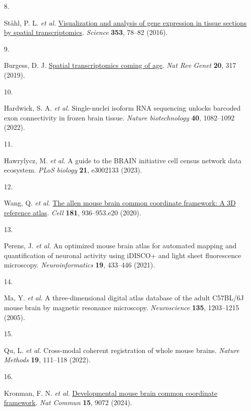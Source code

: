 \documentclass[
  12pt,
]{article}
\newlength{\cslhangindent}
\newlength{\csllabelwidth}
\newenvironment{CSLReferences}[2] %
 {\begin{list}{}{%
  \setlength{\itemindent}{0pt}
  \setlength{\leftmargin}{0pt}
  \setlength{\parsep}{0pt}
  \ifodd #1
   \setlength{\leftmargin}{\cslhangindent}
   \setlength{\itemindent}{-1\cslhangindent}
  \fi
  \setlength{\itemsep}{#2\baselineskip}}}
 {\end{list}}
\newcommand{\CSLLeftMargin}[1]{\parbox[t]{\csllabelwidth}{\strut#1\strut}}
\newcommand{\CSLRightInline}[1]{\parbox[t]{\linewidth - \csllabelwidth}{\strut#1\strut}}
\begin{document}
\begin{CSLReferences}{0}{0}
\CSLLeftMargin{8. }%
\CSLRightInline{Ståhl, P. L. \emph{et al.}
\href{https://doi.org/10.1126/science.aaf2403}{Visualization and
analysis of gene expression in tissue sections by spatial
transcriptomics}. \emph{Science} \textbf{353}, 78--82 (2016).}

\CSLLeftMargin{9. }%
\CSLRightInline{Burgess, D. J.
\href{https://doi.org/10.1038/s41576-019-0129-z}{Spatial transcriptomics
coming of age}. \emph{Nat Rev Genet} \textbf{20}, 317 (2019).}

\CSLLeftMargin{10. }%
\CSLRightInline{Hardwick, S. A. \emph{et al.} Single-nuclei isoform RNA
sequencing unlocks barcoded exon connectivity in frozen brain tissue.
\emph{Nature biotechnology} \textbf{40}, 1082--1092 (2022).}

\CSLLeftMargin{11. }%
\CSLRightInline{Hawrylycz, M. \emph{et al.} A guide to the BRAIN
initiative cell census network data ecosystem. \emph{PLoS biology}
\textbf{21}, e3002133 (2023).}

\CSLLeftMargin{12. }%
\CSLRightInline{Wang, Q. \emph{et al.}
\href{https://doi.org/10.1016/j.cell.2020.04.007}{The allen mouse brain
common coordinate framework: A 3D reference atlas}. \emph{Cell}
\textbf{181}, 936--953.e20 (2020).}

\CSLLeftMargin{13. }%
\CSLRightInline{Perens, J. \emph{et al.} An optimized mouse brain atlas
for automated mapping and quantification of neuronal activity using
iDISCO+ and light sheet fluorescence microscopy. \emph{Neuroinformatics}
\textbf{19}, 433--446 (2021).}

\CSLLeftMargin{14. }%
\CSLRightInline{Ma, Y. \emph{et al.} A three-dimensional digital atlas
database of the adult C57BL/6J mouse brain by magnetic resonance
microscopy. \emph{Neuroscience} \textbf{135}, 1203--1215 (2005).}

\CSLLeftMargin{15. }%
\CSLRightInline{Qu, L. \emph{et al.} Cross-modal coherent registration
of whole mouse brains. \emph{Nature Methods} \textbf{19}, 111--118
(2022).}

\CSLLeftMargin{16. }%
\CSLRightInline{Kronman, F. N. \emph{et al.}
\href{https://doi.org/10.1038/s41467-024-53254-w}{Developmental mouse
brain common coordinate framework}. \emph{Nat Commun} \textbf{15}, 9072
(2024).}


\end{CSLReferences}
\end{document}
